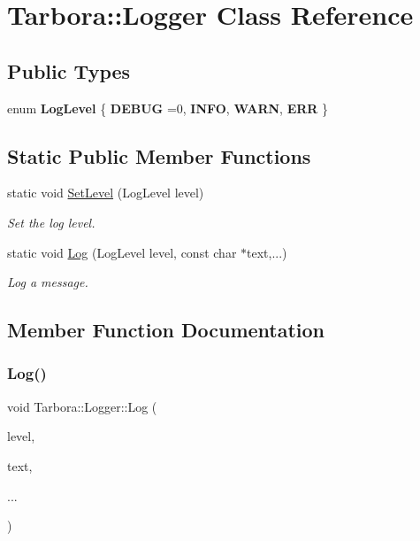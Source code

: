 \hypertarget{classTarbora_1_1Logger}{}\section{Tarbora\+:\+:Logger Class Reference}
\label{classTarbora_1_1Logger}
\subsection*{Public Types}
\begin{DoxyCompactItemize}
\item 
\mbox{\label{classTarbora_1_1Logger_a0596faea258f2da51ad7ca3abd806be3}} 
enum {\bfseries Log\+Level} \{ {\bfseries D\+E\+B\+UG} =0, 
{\bfseries I\+N\+FO}, 
{\bfseries W\+A\+RN}, 
{\bfseries E\+RR}
 \}
\end{DoxyCompactItemize}
\subsection*{Static Public Member Functions}
\begin{DoxyCompactItemize}
\item 
static void \hyperlink{classTarbora_1_1Logger_a59bc914b6c12023fbce1b230899ac5fa}{Set\+Level} (Log\+Level level)
\begin{DoxyCompactList}\small\item\em Set the log level. \end{DoxyCompactList}\item 
static void \hyperlink{classTarbora_1_1Logger_aa32641fca455178d88f3b1c8b2f552ab}{Log} (Log\+Level level, const char $\ast$text,...)
\begin{DoxyCompactList}\small\item\em Log a message. \end{DoxyCompactList}\end{DoxyCompactItemize}


\subsection{Member Function Documentation}
\mbox{\label{classTarbora_1_1Logger_aa32641fca455178d88f3b1c8b2f552ab}} 
\subsubsection{\texorpdfstring{Log()}{Log()}}
{\footnotesize\ttfamily void Tarbora\+::\+Logger\+::\+Log (\begin{DoxyParamCaption}\item[{Log\+Level}]{level,  }\item[{const char $\ast$}]{text,  }\item[{}]{... }\end{DoxyParamCaption})\hspace{0.3cm}{\ttfamily [static]}}



